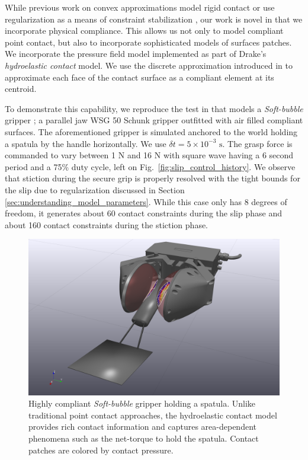 While previous work on convex approximations model rigid contact
\cite{bib:anitescu2006,bib:mazhar2014} or use regularization as a means of
constraint stabilization \cite{bib:todorov2014}, our work is novel in that we
incorporate physical compliance. This allows us not only to model compliant
point contact, but also to incorporate sophisticated models of surfaces patches.
We incorporate the pressure field model \cite{bib:elandt2019pressure}
implemented as part of Drake's \cite{bib:drake} \emph{hydroelastic contact}
model. We use the discrete approximation introduced in
\cite{bib:masterjohn2021discrete} to approximate each face of the contact
surface as a compliant element at its centroid.

To demonstrate this capability, we reproduce the test in
\cite{bib:masterjohn2021discrete} that models a \emph{Soft-bubble} gripper
\cite{bib:kuppuswamy2020soft}; a parallel jaw WSG 50 Schunk gripper outfitted
with air filled compliant surfaces. The aforementioned gripper is simulated
anchored to the world holding a spatula by the handle horizontally. We use
$\delta t=5\times 10^{-3}\text{ s}$. The grasp force is commanded to vary
between 1 N and 16 N with square wave having a 6 second period and a 75\% duty
cycle, left on Fig.~\ref{fig:slip_control_history}.  We observe that stiction during the
secure grip is properly resolved with the tight bounds for the slip due to
regularization discussed in Section \ref{sec:understanding_model_parameters}.
While this case only has 8 degrees of freedom, it generates about 60 contact
constraints during the slip phase and about 160 contact constraints during the
stiction phase.

\begin{figure}[!h]
	\centering
	\includegraphics[width=0.8\columnwidth]{figures/slip_control/slip_control_single_frame.png}
	\caption{\label{fig:slip_control_frame} 
	Highly compliant \emph{Soft-bubble} gripper \cite{bib:kuppuswamy2020soft}
	holding a spatula. Unlike traditional point contact approaches, the
	hydroelastic contact model provides rich contact information and captures
	area-dependent phenomena such as the net-torque to hold the spatula. Contact
	patches are colored by contact pressure.}
\end{figure}

